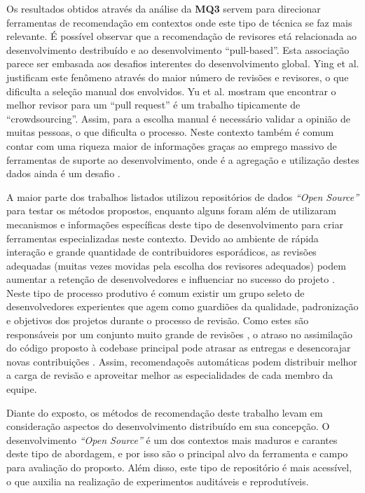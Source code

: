 \documentclass[12pt,openany,oneside,a4paper,english,brazil]{abntbibufjf}
\begin{document}
Os resultados obtidos através da análise da \textbf{MQ3} servem para direcionar ferramentas de recomendação em contextos onde este tipo de técnica se faz mais relevante. É possível observar que a recomendação de revisores etá relacionada ao desenvolvimento destribuído e ao desenvolvimento ``pull-based''. Esta associação parece ser embasada aos desafios interentes do desenvolvimento global. Ying et al. \cite{ying2016} justificam este fenômeno através do maior número de revisões e revisores, o que dificulta a seleção manual dos envolvidos. Yu et al. \cite{yu2014} mostram que encontrar o melhor revisor para um ``pull request'' é um trabalho tipicamente de ``crowdsourcing''. Assim, para a escolha manual é necessário validar a opinião de muitas pessoas, o que dificulta o processo. Neste contexto também é comum contar com uma riqueza maior de informações graças ao emprego massivo de ferramentas de suporte ao desenvolvimento, onde é a agregação e utilização destes dados ainda é um desafio \cite{rahman2016}.

A maior parte dos trabalhos listados utilizou repositórios de dados \textit{``Open Source''} para testar os métodos propostos, enquanto alguns foram além de utilizaram mecanismos e informações específicas deste tipo de desenvolvimento para criar ferramentas especializadas neste contexto. Devido ao ambiente de rápida interação e grande quantidade de contribuidores esporádicos, as revisões adequadas (muitas vezes movidas pela escolha dos revisores adequados) podem aumentar a retenção de desenvolvedores e influenciar no sucesso do projeto \cite{fu2017}. Neste tipo de processo produtivo é comum existir um grupo seleto de desenvolvedores experientes que agem como guardiões da qualidade, padronização e objetivos dos projetos durante o processo de revisão. Como estes são responsáveis por um conjunto muito grande de revisões \cite{lee2013}, o atraso no assimilação do código proposto à codebase principal pode atrasar as entregas e desencorajar novas contribuições \cite{jiang2015}. Assim, recomendaçoẽs automáticas podem distribuir melhor a carga de revisão e aproveitar melhor as especialidades de cada membro da equipe.

Diante do exposto, os métodos de recomendação deste trabalho levam em consideração aspectos do desenvolvimento distribuído em sua concepção. O desenvolvimento \textit{``Open Source''} é um dos contextos mais maduros e carantes deste tipo de abordagem, e por isso são o principal alvo da ferramenta e campo para avaliação do proposto. Além disso, este tipo de repositório é mais acessível, o que auxilia na realização de experimentos auditáveis e reprodutíveis.
\end{document}
